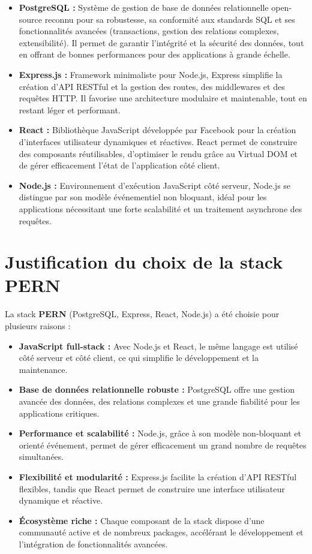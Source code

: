 \documentclass[12pt,a4paper]{report}
\begin{document}
\begin{itemize}
    \item \textbf{PostgreSQL :} Système de gestion de base de données relationnelle open-source reconnu pour sa robustesse, sa conformité aux standards SQL et ses fonctionnalités avancées (transactions, gestion des relations complexes, extensibilité). Il permet de garantir l’intégrité et la sécurité des données, tout en offrant de bonnes performances pour des applications à grande échelle.
    \item \textbf{Express.js :} Framework minimaliste pour Node.js, Express simplifie la création d’API RESTful et la gestion des routes, des middlewares et des requêtes HTTP. Il favorise une architecture modulaire et maintenable, tout en restant léger et performant.
    \item \textbf{React :} Bibliothèque JavaScript développée par Facebook pour la création d’interfaces utilisateur dynamiques et réactives. React permet de construire des composants réutilisables, d’optimiser le rendu grâce au Virtual DOM et de gérer efficacement l’état de l’application côté client.
    \item \textbf{Node.js :} Environnement d’exécution JavaScript côté serveur, Node.js se distingue par son modèle événementiel non bloquant, idéal pour les applications nécessitant une forte scalabilité et un traitement asynchrone des requêtes.
\end{itemize}

\section*{Justification du choix de la stack PERN}

La stack \textbf{PERN} (PostgreSQL, Express, React, Node.js) a été choisie pour plusieurs raisons :  

\begin{itemize}
    \item \textbf{JavaScript full-stack :} Avec Node.js et React, le même langage est utilisé côté serveur et côté client, ce qui simplifie le développement et la maintenance.
    \item \textbf{Base de données relationnelle robuste :} PostgreSQL offre une gestion avancée des données, des relations complexes et une grande fiabilité pour les applications critiques.
    \item \textbf{Performance et scalabilité :} Node.js, grâce à son modèle non-bloquant et orienté événement, permet de gérer efficacement un grand nombre de requêtes simultanées.
    \item \textbf{Flexibilité et modularité :} Express.js facilite la création d’API RESTful flexibles, tandis que React permet de construire une interface utilisateur dynamique et réactive.
    \item \textbf{Écosystème riche :} Chaque composant de la stack dispose d’une communauté active et de nombreux packages, accélérant le développement et l’intégration de fonctionnalités avancées.
\end{itemize}
\end{document}
